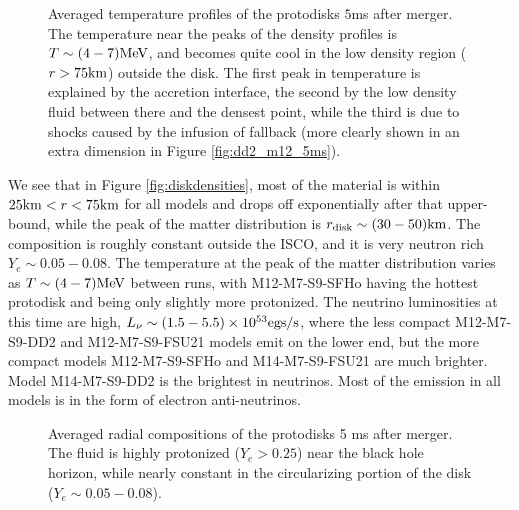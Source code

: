 \begin{figure}
	\centering
	
	\caption[Temperature profiles of the protodisks $5$ms after merger]{
		Averaged temperature profiles of the protodisks $5$ms after merger.  The temperature near the peaks of the density profiles is $T \sim (4-7) {\rm MeV}$, and becomes quite cool in the low density region ($r>75 {\rm km}$) outside the disk.  The first peak in temperature is explained by the accretion interface, the second by the low density fluid between there and the densest point, while the third is due to shocks caused by the infusion of fallback (more clearly shown in an extra dimension in Figure \ref{fig:dd2_m12_5ms}).
	}
	\label{fig:disktemps}
\end{figure}

We see that in Figure \ref{fig:diskdensities}, most of the material is within 
$25 {\rm km} < r < 75{\rm km}$ for all models and drops off exponentially after that upper-bound, while the peak of the matter distribution is $r _{\rm disk} \sim (30 - 50) {\rm km}$.  
The composition is roughly constant outside the ISCO, and it is very neutron rich $Y_e \sim 0.05 - 0.08$.  The temperature at the peak of the matter distribution varies as $T \sim (4-7) {\rm MeV}$ between runs, with M12-M7-S9-SFHo having the hottest protodisk and being only slightly more protonized. 
The neutrino luminosities at this time are high, $L_\nu \sim (1.5 - 5.5) \times 10^{53} {\rm egs/s}$, where the less compact M12-M7-S9-DD2 and M12-M7-S9-FSU21 models emit on the lower end, but the more compact models M12-M7-S9-SFHo  and M14-M7-S9-FSU21 are much brighter.
Model M14-M7-S9-DD2 is the brightest in neutrinos.
Most of the emission in all models is in the form of electron anti-neutrinos.


\begin{figure}
	\centering
	
	\caption[Radial compositions of the protodisks 5 ms after merger]{
	Averaged radial compositions of the protodisks 5 ms after merger.  
	The fluid is highly protonized ($Y_e > 0.25$) near the black hole horizon, while nearly constant in the circularizing portion of the disk ($Y_e \sim 0.05 - 0.08$).
	}
	\label{fig:diskYes}
\end{figure}

%	

